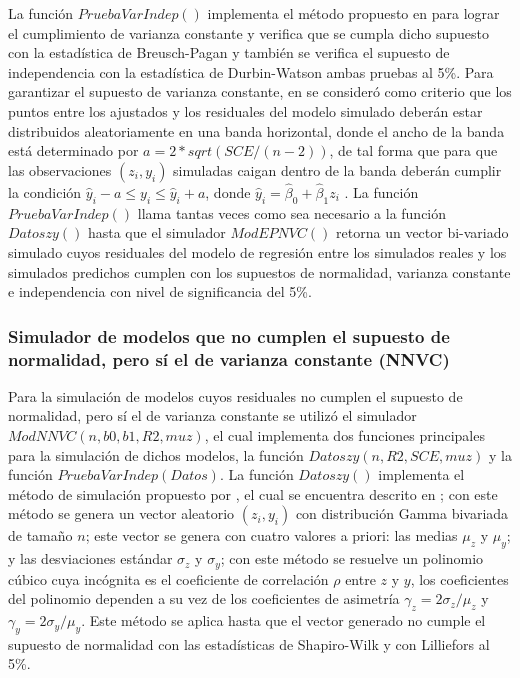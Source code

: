La función $PruebaVarIndep()$ implementa el método propuesto en \textcite{febles-2014} para lograr el cumplimiento de varianza constante y verifica que se cumpla dicho supuesto con la estadística de Breusch-Pagan y también se verifica el supuesto de independencia con la estadística de Durbin-Watson ambas pruebas al 5\%. Para garantizar el supuesto de varianza constante, en \textcite{febles-2014} se consideró como criterio que los puntos entre los ajustados y los residuales del modelo simulado deberán estar distribuidos aleatoriamente en una banda horizontal, donde el ancho de la banda está determinado por $a=2*sqrt(SCE/(n-2))$, de tal forma que para que las observaciones $(z_i, y_i)$ simuladas caigan dentro de la banda deberán cumplir la condición $\hat{y}_i - a \leq y_i \leq \hat{y}_i + a $, donde $\hat{y}_i=\hat{\beta}_0+\hat{\beta}_1 z_i$ . La función $PruebaVarIndep()$ llama tantas veces como sea necesario a la función $Datoszy()$ hasta que el simulador $ModEPNVC()$  retorna un vector bi-variado simulado cuyos residuales del modelo de regresión entre los simulados reales y los simulados predichos cumplen con los supuestos de normalidad, varianza constante e independencia con nivel de significancia del 5\%.\\ 

\subsubsection{Simulador de modelos que no cumplen el supuesto de normalidad, pero sí el de varianza constante (NNVC)}


Para la simulación de modelos cuyos residuales no cumplen el supuesto de normalidad, pero sí el de varianza constante se utilizó el simulador $ModNNVC(n,b0,b1,R2,muz)$, el cual implementa dos funciones principales para la simulación de dichos modelos, la función $Datoszy(n,R2,SCE,muz)$ y la función $PruebaVarIndep(Datos)$. La función $Datoszy()$ implementa el método de simulación propuesto por \textcite{cheng-2011} , el cual se encuentra descrito en \textcite{febles-2014}; con este método se genera un vector aleatorio $(z_i, y_i)$ con distribución Gamma bivariada de tamaño $n$; este vector se genera con cuatro valores a priori: las medias $\mu_z$ y $\mu_y$; y las desviaciones estándar $\sigma_z$ y $\sigma_y$; con este método se resuelve un polinomio cúbico cuya incógnita es el coeficiente de correlación $\rho$ entre $z$ y $y$, los coeficientes del polinomio dependen a su vez de los coeficientes de asimetría $\gamma_z=2\sigma_z/ \mu_z$ y $\gamma_y=2\sigma_y/ \mu_y$. Este método se aplica hasta que el vector generado no cumple el supuesto de normalidad con las estadísticas de Shapiro-Wilk y con Lilliefors al 5\%.\\


